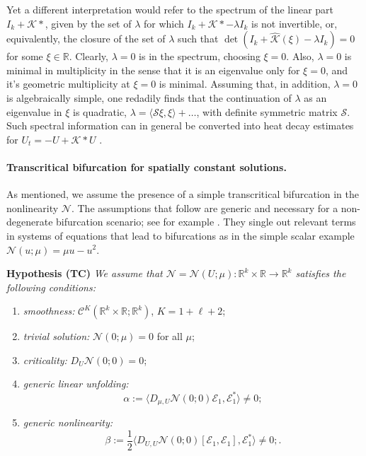 \documentclass[10pt]{article}
\newenvironment{Hypothesis}[1]%
  {\begin{trivlist}\item[]{\bf Hypothesis #1 }\em}{\end{trivlist}}
\newcommand{\R}{\mathbb{R}}
\newcommand{\Nl}{\mathcal{N}}
\newcommand{\K}{\mathcal{K}}
\begin{document}
%
Yet a different interpretation would refer to the spectrum of the linear part $I_k + \K*$, given by the set of $\lambda$ for which $I_k + \K*-\lambda I_k$ is not invertible, or, equivalently, the  closure of the set of $\lambda$ such that $\det(I_k+\widehat{\K}(\xi)-\lambda I_k)= 0$ for some $\xi\in\R$. Clearly, $\lambda=0$ is in the spectrum, choosing $\xi=0$. Also, $\lambda=0$ is minimal in multiplicity in the sense that it is an eigenvalue only for $\xi=0$, and it's geometric multiplicity at $\xi=0$ is minimal. Assuming that, in addition, $\lambda=0$ is algebraically simple, one redadily finds that the continuation of $\lambda$ as an eigenvalue in $\xi$ is quadratic, $\lambda= \langle \mathcal{S}\xi,\xi\rangle+\ldots$, with definite symmetric matrix  $\mathcal{S}$. Such spectral information can in general be converted into heat decay estimates for $U_t=-U+\K*U$ \cite{heatnl}.


\paragraph{Transcritical bifurcation for spatially constant solutions.}
As mentioned, we assume the presence of a simple transcritical bifurcation in the nonlinearity $\Nl$. The assumptions that follow are generic and necessary for a non-degenerate bifurcation scenario; see for example \cite{chowhale}.  They single out relevant terms in systems of equations that lead to bifurcations as in the simple scalar example $\Nl(u;\mu)=\mu u - u^2$. 
 
\begin{Hypothesis} {(TC)} We assume that $\Nl=\Nl(U;\mu):\R^k \times \R \to \R^k $ satisfies the following conditions:
\begin{enumerate}
\item 
\emph{smoothness: }
$\mathscr{C}^{K}(\R^k \times \R; \R^k)$, $K=1+\ell+2$;
\item \emph{trivial solution: } $\Nl(0;\mu) = 0$ for all $\mu$;
\item \emph{criticality:} $D_U\Nl(0;0)=0$;
\item \emph{generic linear unfolding:  }
\begin{equation}
\alpha := \langle D_{\mu,U} \Nl(0;0)\mathcal{E}_1, \mathcal{E}_1^*\rangle \neq 0; \label{muvCoe}\end{equation}
\item \emph{generic nonlinearity: } 
\begin{equation}
\beta := \frac{1}{2}\langle D_{U,U} \Nl(0;0)[\mathcal{E}_1,\mathcal{E}_1], \mathcal{E}_1^*\rangle \neq 0;  \label{QuadCoe}.
\end{equation}
\end{enumerate}
\end{Hypothesis}
\end{document}
